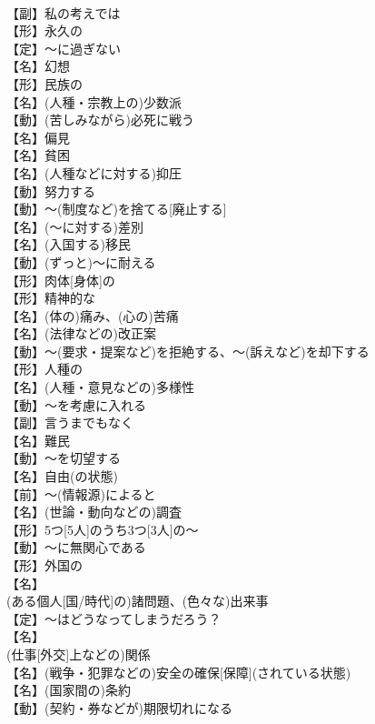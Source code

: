 \documentclass[8pt]{extreport}
\begin{document}
\begin{CJK}{UTF8}{min}
\\	【副】私の考えでは
\\	【形】永久の
\\	【定】～に過ぎない
\\	【名】幻想
\\	【形】民族の
\\	【名】(人種・宗教上の)少数派
\\	【動】(苦しみながら)必死に戦う
\\	【名】偏見
\\	【名】貧困
\\	【名】(人種などに対する)抑圧
\\	【動】努力する
\\	【動】～(制度など)を捨てる[廃止する]
\\	【名】(～に対する)差別
\\	【名】(入国する)移民
\\	【動】(ずっと)～に耐える
\\	【形】肉体[身体]の
\\	【形】精神的な
\\	【名】(体の)痛み、(心の)苦痛
\\	【名】(法律などの)改正案
\\	【動】～(要求・提案など)を拒絶する、～(訴えなど)を却下する
\\	【形】人種の
\\	【名】(人種・意見などの)多様性
\\	【動】～を考慮に入れる
\\	【副】言うまでもなく
\\	【名】難民
\\	【動】～を切望する
\\	【名】自由(の状態)
\\	【前】～(情報源)によると
\\	【名】(世論・動向などの)調査
\\	【形】5つ[5人]のうち3つ[3人]の～
\\	【動】～に無関心である
\\	【形】外国の
\\	【名】
\\	(ある個人[国/時代]の)諸問題、(色々な)出来事
\\	【定】～はどうなってしまうだろう？
\\	【名】
\\	(仕事[外交]上などの)関係
\\	【名】(戦争・犯罪などの)安全の確保[保障](されている状態)
\\	【名】(国家間の)条約
\\	【動】(契約・券などが)期限切れになる

\end{CJK}
\end{document}

